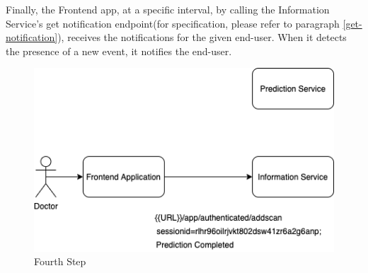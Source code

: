 			Finally, the Frontend app, at a specific interval, by calling the Information Service's get notification endpoint(for 
			specification, please refer to paragraph  \ref{get-notification}), receives the notifications for the given end-user. 
			When it detects the presence of a  new event, it notifies the end-user.
			\begin{figure}[H]
				\iftrue
				\caption{Fourth Step}
				\centering
				\includegraphics[scale=0.6]{figures/sca-creation-sequence-1-Page-3-2}
				\fi
			\end{figure}
				
				
				
					
